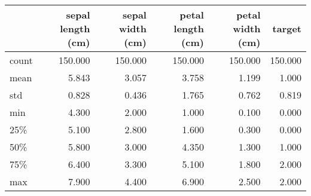 \begin{tabular}{lrrrrr}
\toprule
{} &  sepal length (cm) &  sepal width (cm) &  petal length (cm) &  petal width (cm) &   target \\
\midrule
count &            150.000 &           150.000 &            150.000 &           150.000 &  150.000 \\
mean  &              5.843 &             3.057 &              3.758 &             1.199 &    1.000 \\
std   &              0.828 &             0.436 &              1.765 &             0.762 &    0.819 \\
min   &              4.300 &             2.000 &              1.000 &             0.100 &    0.000 \\
25\%   &              5.100 &             2.800 &              1.600 &             0.300 &    0.000 \\
50\%   &              5.800 &             3.000 &              4.350 &             1.300 &    1.000 \\
75\%   &              6.400 &             3.300 &              5.100 &             1.800 &    2.000 \\
max   &              7.900 &             4.400 &              6.900 &             2.500 &    2.000 \\
\bottomrule
\end{tabular}
